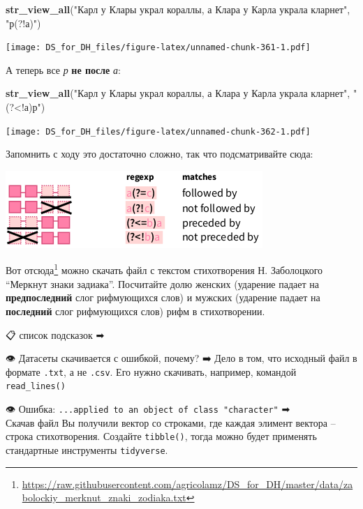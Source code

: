 \documentclass[
]{book}
\makeatletter
\newenvironment{Shaded}{\begin{snugshade}}{\end{snugshade}}
\newcommand{\KeywordTok}[1]{\textcolor[rgb]{0.13,0.29,0.53}{\textbf{#1}}}
\newcommand{\NormalTok}[1]{#1}
\newcommand{\StringTok}[1]{\textcolor[rgb]{0.31,0.60,0.02}{#1}}
\renewcommand{\href}[2]{#2\footnote{\url{#1}}}
\newenvironment{kframe}{%
    \medskip{}
    \setlength{\fboxsep}{.8em}
    \def\at@end@of@kframe{}%
    \ifinner\ifhmode%
    \def\at@end@of@kframe{\end{minipage}}%
    \begin{minipage}{\columnwidth}%
    \fi\fi%
    \def\FrameCommand##1{\hskip\@totalleftmargin \hskip-\fboxsep
    \colorbox{shadecolor}{##1}\hskip-\fboxsep
        \hskip-\linewidth \hskip-\@totalleftmargin \hskip\columnwidth}%
    \MakeFramed {\advance\hsize-\width
      \@totalleftmargin\z@ \linewidth\hsize
      \@setminipage}}%
  {\par\unskip\endMakeFramed%
    \at@end@of@kframe}
\newenvironment{rmdblock}[1]
  {
    \begin{itemize}
    \renewcommand{\labelitemi}{
      \raisebox{-.7\height}[0pt][0pt]{
        {\setkeys{Gin}{width=3em,keepaspectratio}\texttt{[image: images/\#1]}}
        }
        }
        \setlength{\fboxsep}{1em}
        \begin{kframe}
        \item
      }
      {
        \end{kframe}
        \end{itemize}
      }
\newenvironment{rmdtask}
      {\begin{rmdblock}{task}}
      {\end{rmdblock}}
\makeatother
\begin{document}
\begin{Shaded}
\begin{Highlighting}[]
\KeywordTok{str_view_all}\NormalTok{(}\StringTok{"Карл у Клары украл кораллы, а Клара у Карла украла кларнет"}\NormalTok{, }\StringTok{"р(?!а)"}\NormalTok{)}
\end{Highlighting}
\end{Shaded}

\texttt{[image: DS\_for\_DH\_files/figure-latex/unnamed-chunk-361-1.pdf]}

А теперь все \emph{р} \textbf{не после} \emph{а}:

\begin{Shaded}
\begin{Highlighting}[]
\KeywordTok{str_view_all}\NormalTok{(}\StringTok{"Карл у Клары украл кораллы, а Клара у Карла украла кларнет"}\NormalTok{, }\StringTok{"(?<!а)р"}\NormalTok{)}
\end{Highlighting}
\end{Shaded}

\texttt{[image: DS\_for\_DH\_files/figure-latex/unnamed-chunk-362-1.pdf]}

Запомнить с ходу это достаточно сложно, так что подсматривайте сюда:

\includegraphics{images/5.16_lookarounds.png}

\begin{rmdtask}
\href{https://raw.githubusercontent.com/agricolamz/DS_for_DH/master/data/zabolockiy_merknut_znaki_zodiaka.txt}{Вот
отсюда} можно скачать файл с текстом стихотворения Н. Заболоцкого
``Меркнут знаки задиака''. Посчитайте долю женских (ударение падает на
\textbf{предпоследний} слог рифмующихся слов) и мужских (ударение падает
на \textbf{последний} слог рифмующихся слов) рифм в стихотворении.
\end{rmdtask}

📋 список подсказок ➡

👁 Датасеты скачивается с ошибкой, почему? ➡
Дело в том, что исходный файл в формате \texttt{.txt}, а не \texttt{.csv}. Его нужно скачивать, например, командой \texttt{read\_lines()}

👁 Ошибка: \texttt{...applied\ to\ an\ object\ of\ class\ "character"} ➡ \\
Скачав файл Вы получили вектор со строками, где каждая элимент вектора -- строка стихотворения. Создайте \texttt{tibble()}, тогда можно будет применять стандартные инструменты \texttt{tidyverse}.
\end{document}
